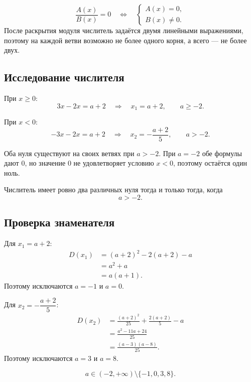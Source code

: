 \begin{propertybox}
  \[
    \frac{A(x)}{B(x)}=0
    \quad\Longleftrightarrow\quad
    \begin{cases}
      A(x)=0,\\
      B(x)\ne0.
    \end{cases}
  \]
  После раскрытия модуля числитель задаётся двумя линейными выражениями,
  поэтому на каждой ветви возможно не более одного корня, а всего --- не
  более двух.
\end{propertybox}

\subsection{Исследование числителя}

При \(x\ge0\):
\[
  3x-2x=a+2
  \quad\Longrightarrow\quad
  x_1=a+2,
  \qquad a\ge-2.
\]

При \(x<0\):
\[
  -3x-2x=a+2
  \quad\Longrightarrow\quad
  x_2=-\frac{a+2}{5},
  \qquad a>-2.
\]

Оба нуля существуют на своих ветвях при \(a>-2\). При \(a=-2\) обе
формулы дают \(0\), но значение \(0\) не удовлетворяет условию \(x<0\),
поэтому остаётся один ноль.

\begin{conclusionbox}
  Числитель имеет ровно два различных нуля тогда и только тогда, когда
  \[
    a>-2.
  \]
\end{conclusionbox}

\subsection{Проверка знаменателя}

Для \(x_1=a+2\):
\begin{align*}
  D(x_1)
  &=(a+2)^2-2(a+2)-a\\
  &=a^2+a\\
  &=a(a+1).
\end{align*}
Поэтому исключаются \(a=-1\) и \(a=0\).

Для \(x_2=-\dfrac{a+2}{5}\):
\begin{align*}
  D(x_2)
  &=\frac{(a+2)^2}{25}+\frac{2(a+2)}5-a\\
  &=\frac{a^2-11a+24}{25}\\
  &=\frac{(a-3)(a-8)}{25}.
\end{align*}
Поэтому исключаются \(a=3\) и \(a=8\).

\begin{resultbox}
  \[
    \boxed{a\in(-2,+\infty)\setminus\{-1,0,3,8\}}.
  \]
\end{resultbox}

